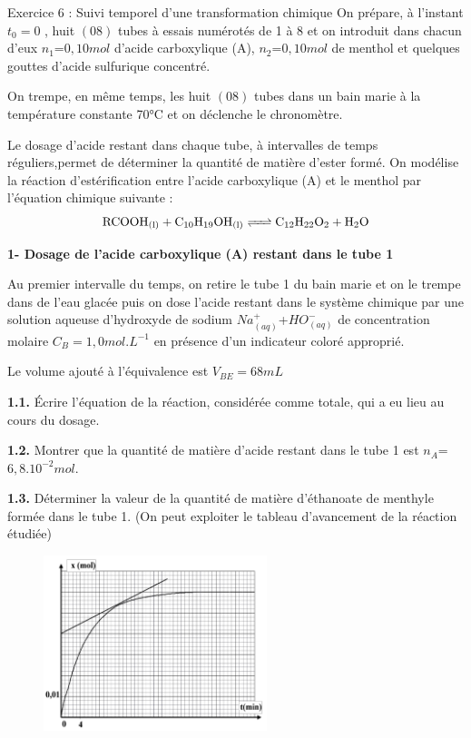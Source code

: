 \documentclass[12pt, french]{article}
\begin{document}
\begin{Box2}{Exercice 6 : Suivi temporel d’une transformation
chimique}
On prépare, à l'instant $t_0 = 0$ , huit $(08)$ tubes à essais numérotés de 1 à 8 et on introduit dans chacun d'eux $n_1$=$0,10 mol$ d'acide carboxylique (A), $n_2$=$0,10 mol$ de menthol et quelques gouttes d'acide sulfurique
concentré. 

On trempe, en même temps, les huit $(08)$ tubes dans un bain marie à la température constante 70°C et on déclenche le chronomètre. 

Le dosage d'acide restant dans chaque tube, à intervalles de temps réguliers,permet de déterminer la quantité de matière d'ester formé.
On modélise la réaction d'estérification entre l'acide carboxylique (A) et le menthol par l'équation chimique
suivante :
$$\ce{RCOOH_{(l)} +C_{10}H_{19}OH_{(l)} <=> C_{12}H_{22}O_2 + H_2O}$$

\textbf{1- Dosage de l'acide carboxylique (A)
restant dans le tube 1}

Au premier intervalle du temps, on retire le tube
1 du bain marie et on le trempe dans de l'eau
glacée puis on dose l'acide restant dans le
système chimique par une solution aqueuse
d’hydroxyde de sodium $Na^+_{(aq)}$+$HO^-_{(aq)}$ de
concentration molaire $C_B = 1,0 mol.L^{-1}$ en
présence d'un indicateur coloré approprié. 

Le volume ajouté à l'équivalence est $V_{BE} =68 mL$

\textbf{1.1. } Écrire l'équation de la réaction,
considérée comme totale, qui a eu lieu
au cours du dosage.

\textbf{1.2. }Montrer que la quantité de matière d'acide restant dans le tube 1 est $n_A$=$6,8.10^{-2} mol$.

\textbf{1.3. }Déterminer la valeur de la quantité de matière d'éthanoate de menthyle formée dans le tube 1. (On peut
exploiter le tableau d'avancement de la réaction étudiée)

\begin{figure}
  \begin{center}
	  \vspace{-1.2cm}
	\includegraphics[width=0.58\textwidth]{./img/ex06.png}
  \end{center}
\end{figure}



\end{Box2}
\end{document}
